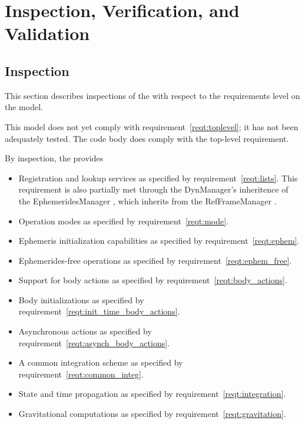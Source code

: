 %
%

\chapter{Inspection, Verification, and Validation}
\label{ch:ivv}

\section{Inspection}\label{ch:inspect}
This section describes inspections of the \ModelDesc
with respect to the requirements level on the model.

\label{inspect:TLI}
This model does not yet comply with requirement~\ref{reqt:toplevel};
it has not been adequately tested.
The code body does comply with the top-level requirement.

\label{inspect:design}
By inspection, the \ModelDesc provides\begin{itemize}
\item Registration and lookup services
  as specified by requirement~\ref{reqt:lists}. This requirement
  is also partially met through the DynManager's inheritence
  of the EphemeridesManager \cite{dynenv:EPHEMERIDES}, which
  inherits from the RefFrameManager \cite{dynenv:REFFRAMES}.
\item Operation modes
  as specified by requirement~\ref{reqt:mode}.
\item Ephemeris initialization capabilities
  as specified by requirement~\ref{reqt:ephem}.
\item Ephemerides-free operations
  as specified by requirement~\ref{reqt:ephem_free}.
\item Support for body actions
  as specified by requirement~\ref{reqt:body_actions}.
\item Body initializations
  as specified by requirement~\ref{reqt:init_time_body_actions}.
\item Asynchronous actions
  as specified by requirement~\ref{reqt:asynch_body_actions}.
\item A common integration scheme
  as specified by requirement~\ref{reqt:common_integ}.
\item State and time propagation
  as specified by requirement~\ref{reqt:integration}.
\item Gravitational computations
  as specified by requirement~\ref{reqt:gravitation}.
\end{itemize}

